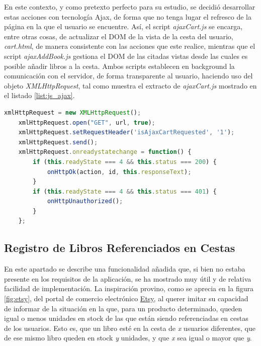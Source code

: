 \documentclass[a4paper]{article}
\begin{document}
    En este contexto, y como pretexto perfecto para su estudio, se decidió desarrollar estas acciones con tecnología Ajax, de forma que no tenga lugar el refresco de la página en la que el usuario se encuentre. Así, el script \emph{ajaxCart.js} se encarga, entre otras cosas, de actualizar el DOM de la vista de la cesta del usuario, \emph{cart.html}, de manera consistente con las acciones que este realice, mientras que el script \emph{ajaxAddBook.js} gestiona el DOM de las citadas vistas desde las cuales es posible añadir libros a la cesta. Ambos scripts establecen en background la comunicación con el servidor, de forma transparente al usuario, haciendo uso del objeto \emph{XMLHttpRequest}, tal como muestra el extracto de \emph{ajaxCart.js} mostrado en el listado \ref{list:js_ajax}.
    \\
    
    \begin{lstlisting}[language=JavaScript,caption=Comunicación Ajax con el servidor,label=list:js_ajax]
    xmlHttpRequest = new XMLHttpRequest();
    xmlHttpRequest.open("GET", url, true);
    xmlHttpRequest.setRequestHeader('isAjaxCartRequested', '1');
    xmlHttpRequest.send();
    xmlHttpRequest.onreadystatechange = function() {
    	if (this.readyState === 4 && this.status === 200) {
    		onHttpOk(action, id, this.responseText);
    	}
    	if (this.readyState === 4 && this.status === 401) {
    		onHttpUnauthorized();
    	}
    };
    \end{lstlisting}
    
    \subsection{Registro de Libros Referenciados en Cestas}
    En este apartado se describe una funcionalidad añadida que, si bien no estaba presente en los requisitos de la aplicación, se ha mostrado muy útil y de relativa facilidad de implementación. La inspiración provino, como se aprecia en la figura \ref{fig:etsy}, del portal de comercio electrónico \href{https://www.etsy.com}{Etsy}, al querer imitar su capacidad de informar de la situación en la que, para un producto determinado, queden igual o menos unidades en stock de las que están siendo referenciadas en cestas de los usuarios. Esto es, que un libro esté en la cesta de \emph{x} usuarios diferentes, que de ese mismo libro queden en stock \emph{y} unidades, y que \emph{x} sea igual o mayor que \emph{y}.
    
\end{document}
